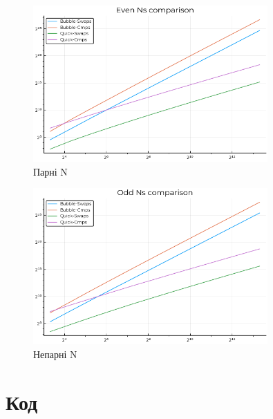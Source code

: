 \documentclass[11pt]{article}
\begin{document}
    \begin{figure}[H]
        \includegraphics[width=0.8\textwidth]{../out/even.png}
        \caption{Парні N}
    \end{figure}

    \begin{figure}[H]
        \includegraphics[width=0.8\textwidth]{../out/odd.png}
        \caption{Непарні N}
    \end{figure}

    \section{Код}
\end{document}
